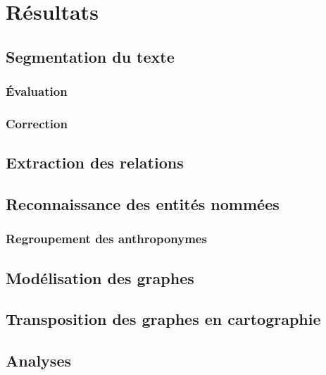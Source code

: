 \chapter{Résultats}
\section{Segmentation du texte}
\subsection{Évaluation}
\subsection{Correction}
\section{Extraction des relations}
\section{Reconnaissance des entités nommées}
\subsection{Regroupement des anthroponymes}
\section{Modélisation des graphes}
\section{Transposition des graphes en cartographie}
\section{Analyses}



